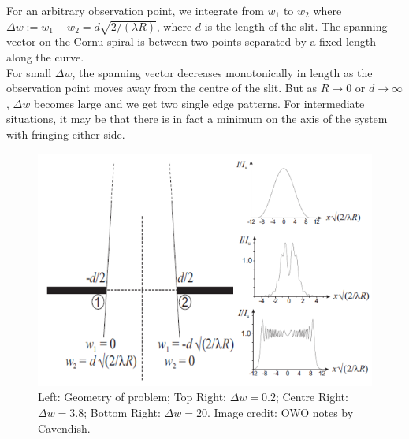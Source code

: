 \documentclass[a4paper]{article}
\begin{document}
\begin{eg}
For an arbitrary observation point, we integrate from $w_1$ to $w_2$ where $\Delta w:=w_1-w_2=d\sqrt{2/(\lambda R)}$, where $d$ is the length of the slit. The spanning vector on the Cornu spiral is between two points separated by a fixed length along the curve.\\[5pt]
For small $\Delta w$, the spanning vector decreases monotonically in length as the observation point moves away from the centre of the slit. But as $R\rightarrow0$ or $d\rightarrow\infty$, $\Delta w$ becomes large and we get two single edge patterns. For intermediate situations, it may be that there is in fact a minimum on the axis of the system with fringing either side.
\end{eg}
\begin{figure}[H]
    \centering
    \includegraphics[scale=0.6]{fresnelslit.PNG}
    \caption{Left: Geometry of problem; Top Right: $\Delta w=0.2$; Centre Right: $\Delta w=3.8$; Bottom Right: $\Delta w=20$. Image credit: OWO notes by Cavendish.}
\end{figure}
\end{document}
